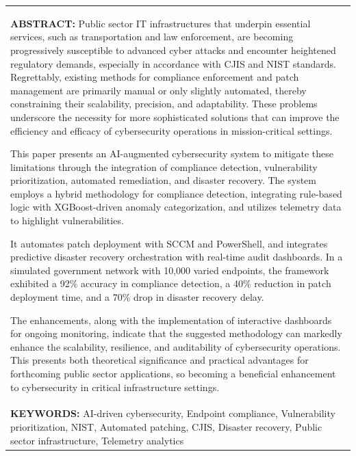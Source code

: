 \documentclass[10pt]{article} %
\begin{document}
\noindent\begin{tabular}{p{6.2in}}
\textbf{ABSTRACT:} Public sector IT infrastructures that underpin essential services, such as transportation and law enforcement, are becoming progressively susceptible to advanced cyber attacks and encounter heightened regulatory demands, especially in accordance with CJIS and NIST standards.  Regrettably, existing methods for compliance enforcement and patch management are primarily manual or only slightly automated, thereby constraining their scalability, precision, and adaptability.  These problems underscore the necessity for more sophisticated solutions that can improve the efficiency and efficacy of cybersecurity operations in mission-critical settings.
 
 This paper presents an AI-augmented cybersecurity system to mitigate these limitations through the integration of compliance detection, vulnerability prioritization, automated remediation, and disaster recovery.  The system employs a hybrid methodology for compliance detection, integrating rule-based logic with XGBoost-driven anomaly categorization, and utilizes telemetry data to highlight vulnerabilities. 

 It automates patch deployment with SCCM and PowerShell, and integrates predictive disaster recovery orchestration with real-time audit dashboards.  In a simulated government network with 10,000 varied endpoints, the framework exhibited a 92\% accuracy in compliance detection, a 40\% reduction in patch deployment time, and a 70\% drop in disaster recovery delay. 

 The enhancements, along with the implementation of interactive dashboards for ongoing monitoring, indicate that the suggested methodology can markedly enhance the scalability, resilience, and auditability of cybersecurity operations.  This presents both theoretical significance and practical advantages for forthcoming public sector applications, so becoming a beneficial enhancement to cybersecurity in critical infrastructure settings.
 \\
\vspace{0.3cm}
\textbf{KEYWORDS:} AI-driven cybersecurity, Endpoint compliance, Vulnerability prioritization, NIST, Automated patching, CJIS, Disaster recovery, Public sector infrastructure, Telemetry analytics\\ \end{tabular} \newline
\end{document}
